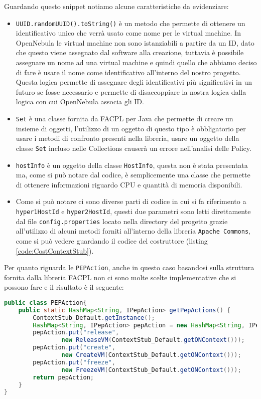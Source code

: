 Guardando questo snippet notiamo alcune caratteristiche da evidenziare:\\
\begin{itemize}
    \item \texttt{UUID.randomUUID().toString()} è un metodo che permette di ottenere un identificativo unico che verrà usato come nome per le virtual machine. In OpenNebula le virtual machine non sono istanziabili a partire da un ID, dato che questo viene assegnato dal software alla creazione, tuttavia è possibile assegnare un nome ad una virtual machine e quindi quello che abbiamo deciso di fare è usare il nome come identificativo all'interno del nostro progetto. Questa logica permette di assegnare degli identificativi più significativi in un futuro se fosse necessario e permette di disaccoppiare la nostra logica dalla logica con cui OpenNebula associa gli ID.
    \item \texttt{Set} è una classe fornita da FACPL per Java che permette di creare un insieme di oggetti, l'utilizzo di un oggetto di questo tipo è obbligatorio per usare i metodi di confronto presenti nella libreria, usare un oggetto della classe \texttt{Set} incluso nelle Collections causerà un errore nell'analisi delle Policy.
    \item \texttt{hostInfo} è un oggetto della classe \texttt{HostInfo}, questa non è stata presentata ma, come si può notare dal codice, è semplicemente una classe che permette di ottenere informazioni riguardo CPU e quantità di memoria disponibili.
    \item Come si può notare ci sono diverse parti di codice in cui si fa riferimento a \texttt{hyper1HostId} e \texttt{hyper2HostId}, questi due parametri sono letti direttamente dal file \texttt{config.properties} locato nella directory del progetto grazie all'utilizzo di alcuni metodi forniti all'interno della libreria \texttt{Apache Commons}\cite{apache_commons}, come si può vedere guardando il codice del costruttore (listing \ref{code:CostContextStub}).
\end{itemize}

Per quanto riguarda le \texttt{PEPAction}, anche in questo caso basandosi sulla struttura fornita dalla libreria FACPL non ci sono molte scelte implementative che si possono fare e il risultato è il seguente:
\begin{lstlisting}[language=Java, caption=Classe PEPAction adattata, label=code:PEPAction]
public class PEPAction{
    public static HashMap<String, IPepAction> getPepActions() {
        ContextStub_Default.getInstance();
        HashMap<String, IPepAction> pepAction = new HashMap<String, IPepAction>();
        pepAction.put("release", 
                new ReleaseVM(ContextStub_Default.getONContext()));
        pepAction.put("create", 
                new CreateVM(ContextStub_Default.getONContext()));
        pepAction.put("freeze", 
                new FreezeVM(ContextStub_Default.getONContext()));
        return pepAction;
    }
}
\end{lstlisting}


